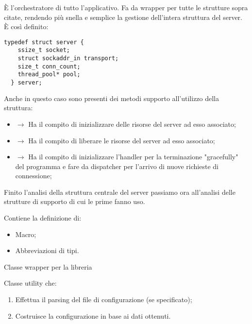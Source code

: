   \begin{center}  \end{center}
  È l'orchestratore di tutto l'applicativo. Fa da wrapper per tutte le strutture sopra citate, rendendo più snella e semplice la gestione dell'intera struttura del server. È così definito:

  \begin{lstlisting}[language={[POSIX]C}, style=wnumbers]
  typedef struct server {
    ssize_t socket;
    struct sockaddr_in transport;
    size_t conn_count;
    thread_pool* pool;
  } server;
  \end{lstlisting}

  Anche in questo caso sono presenti dei metodi supporto all'utilizzo della struttura:

  \begin{itemize}
    \item {} $\rightarrow$ Ha il compito di inizializzare delle risorse del server ad esso associato;
    \item {} $\rightarrow$ Ha il compito di liberare le risorse del server ad esso associato;
    \item {} $\rightarrow$ Ha il compito di inizializzare l'handler per la terminazione "gracefully" del programma e fare da dispatcher per l'arrivo di nuove richieste di connessione;
  \end{itemize}

  Finito l'analisi della struttura centrale del server passiamo ora all'analisi delle strutture di supporto di cui le prime fanno uso.

  \begin{center}  \end{center}
  Contiene la definizione di:
  \begin{itemize}
    \item Macro;
    \item Abbreviazioni di tipi.
  \end{itemize}

  \begin{center}  \end{center}
  Classe wrapper per la libreria 

  \begin{center}  \end{center}
  Classe utility che:

  \begin{enumerate}
    \item Effettua il parsing del file di configurazione (se specificato);
    \item Costruisce la configurazione in base ai dati ottenuti.
  \end{enumerate}

